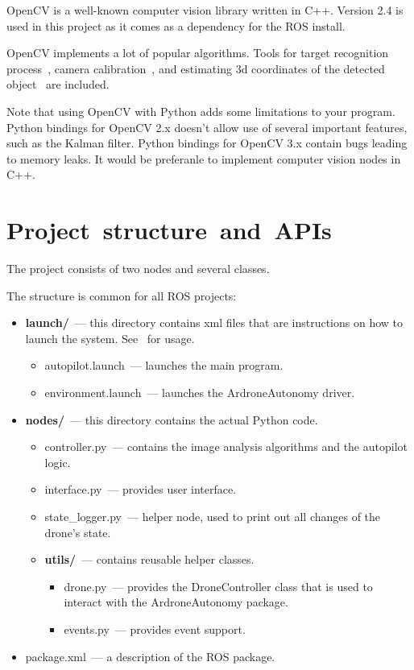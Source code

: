 \documentclass[12pt]{article}
\begin{document}
    OpenCV is a well-known computer vision library written in C++.
    Version 2.4 is used in this project as it comes as a dependency
    for the ROS install.

    OpenCV implements a lot of popular algorithms. Tools for target
    recognition process~\cite{SURF, ORB}, camera calibration~\cite{OpenCVCalib},
    and estimating 3d coordinates of the detected object~\cite{OpenCV3dRec}
    are included.

    Note that using OpenCV with Python adds some limitations to your program.
    Python bindings for OpenCV 2.x doesn't allow use of several important
    features, such as the Kalman filter. Python bindings for OpenCV 3.x contain
    bugs leading to memory leaks. It would be preferanle to implement
    computer vision nodes in C++.

    \section{Project~structure~and~APIs}

    The project consists of two nodes and several classes.

    The structure is common for all ROS projects:

    \begin{itemize}
        \item {\bf launch/}~--- this directory contains xml files that
        are instructions on how to launch the system. See~\cite{roslaunch}
        for usage.
        \begin{itemize}
            \item autopilot.launch~--- launches the main program.
            \item environment.launch~--- launches the ArdroneAutonomy driver.
        \end{itemize}
        \item {\bf nodes/}~--- this directory contains the actual Python code.
        \begin{itemize}
            \item controller.py~--- contains the image analysis algorithms and
            the autopilot logic.
            \item interface.py~--- provides user interface.
            \item state\_logger.py~--- helper node, used to print out all
            changes of the drone's state.
            \item {\bf utils/}~--- contains reusable helper classes.
            \begin{itemize}
                \item drone.py~--- provides the DroneController class that is
                used to interact with the ArdroneAutonomy package.
                \item events.py~--- provides event support.
            \end{itemize}
        \end{itemize}
        \item package.xml~--- a description of the ROS package.
    \end{itemize}
\end{document}
